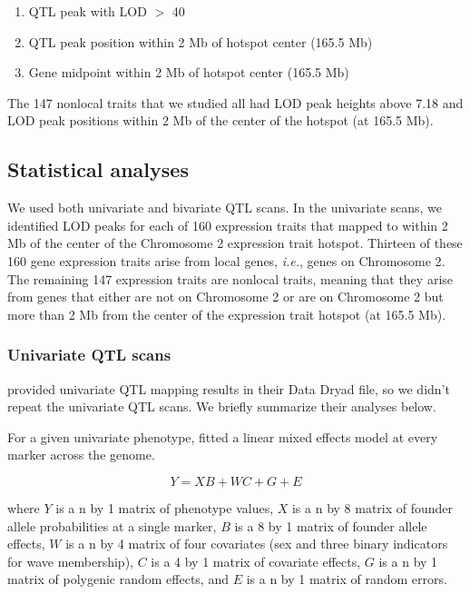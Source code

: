 \documentclass{article}
\begin{document}
\begin{enumerate}
    \item QTL peak with LOD $>$ 40
    \item QTL peak position within 2 Mb of hotspot center (165.5 Mb)
    \item Gene midpoint within 2 Mb of hotspot center (165.5 Mb)
\end{enumerate}

The 147 nonlocal traits that we studied all had LOD peak heights above 7.18 and LOD peak positions within 2 Mb of the center of the hotspot (at 165.5 Mb). 



\subsection{Statistical analyses}

We used both univariate and bivariate QTL scans. In the univariate scans, we identified LOD peaks for each of 160 expression traits that mapped to within 2 Mb of the center of the Chromosome 2 expression trait hotspot. Thirteen of these 160 gene expression traits arise from local genes, \emph{i.e.}, genes on Chromosome 2. The remaining 147 expression traits are nonlocal traits, meaning that they arise from genes that either are not on Chromosome 2 or are on Chromosome 2 but more than 2 Mb from the center of the expression trait hotspot (at 165.5 Mb). 




\subsubsection{Univariate QTL scans}

\citet{keller2018genetic} provided univariate QTL mapping results in their Data Dryad file, so we didn't repeat the univariate QTL scans. We briefly summarize their analyses below.

For a given univariate phenotype, \citet{keller2018genetic} fitted a linear mixed effects model at every marker across the genome.

\begin{equation}
    Y = XB + WC + G + E
    \label{eqn:uni-lmm}
\end{equation}

where $Y$ is a n by 1 matrix of phenotype values, $X$ is a n by 8 matrix of founder allele probabilities at a single marker, $B$ is a 8 by 1 matrix of founder allele effects, $W$ is a n by 4 matrix of four covariates (sex and three binary indicators for wave membership), $C$ is a 4 by 1 matrix of covariate effects, $G$ is a n by 1 matrix of polygenic random effects, and $E$ is a n by 1 matrix of random errors.
\end{document}
